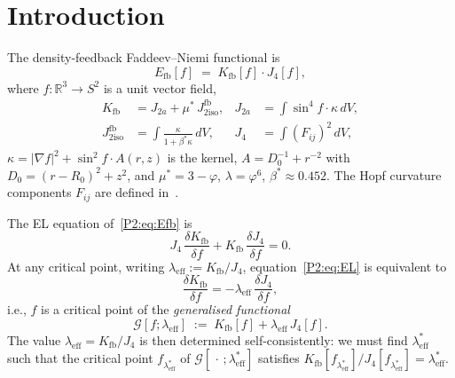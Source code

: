 \documentclass[11pt,a4paper]{article}
\newcommand{\vp}{\varphi}
\newcommand{\ms}{\mu^{*}}
\newcommand{\lam}{\lambda}
\newcommand{\leff}{\lambda_{\mathrm{eff}}}
\newcommand{\bst}{\beta^{*}}
\newcommand{\Kfb}{K_{\mathrm{fb}}}
\newcommand{\Efb}{E_{\mathrm{fb}}}
\newcommand{\Jfb}{J_{2\mathrm{iso}}^{\mathrm{fb}}}
\newcommand{\Ja}{J_{2a}}
\newcommand{\Jfour}{J_{4}}
\newcommand{\kk}{\kappa}
\newcommand{\G}{\mathcal{G}}
\theoremstyle{remark}
\begin{document}
\section{Introduction}
\label{P2:sec:intro}

The density-feedback Faddeev--Niemi functional is
\begin{equation}
  \Efb[f] \;=\; \Kfb[f]\cdot\Jfour[f],
  \label{P2:eq:Efb}
\end{equation}
where $f\colon\mathbb{R}^3\to S^2$ is a unit vector field,
\begin{align}
  \Kfb  &= \Ja + \ms\,\Jfb, &
  \Ja   &= \int \sin^4\!f\cdot\kk\,dV, \\
  \Jfb  &= \int \frac{\kk}{1+\bst\kk}\,dV, &
  \Jfour &= \int (F_{ij})^2\,dV,
\end{align}
$\kk = |\nabla f|^2 + \sin^2\!f\cdot A(r,z)$ is the kernel,
$A = D_0^{-1}+r^{-2}$ with $D_0=(r-R_0)^2+z^2$,
and $\ms = 3-\vp$, $\lam = \vp^6$, $\bst \approx 0.452$.
The Hopf curvature components $F_{ij}$ are defined in~\cite{Paper1}.

The EL equation of~\eqref{P2:eq:Efb} is
\begin{equation}
  \Jfour\,\frac{\delta\Kfb}{\delta f}
  + \Kfb\,\frac{\delta\Jfour}{\delta f} = 0.
  \label{P2:eq:EL}
\end{equation}
At any critical point, writing $\leff := \Kfb/\Jfour$,
equation~\eqref{P2:eq:EL} is equivalent to
\begin{equation}
  \frac{\delta\Kfb}{\delta f} = -\leff\,\frac{\delta\Jfour}{\delta f},
  \label{P2:eq:BPS}
\end{equation}
i.e., $f$ is a critical point of the \emph{generalised functional}
\begin{equation}
  \G[f;\leff] \;:=\; \Kfb[f] + \leff\,\Jfour[f].
  \label{P2:eq:G}
\end{equation}
The value $\leff = \Kfb/\Jfour$ is then determined self-consistently:
we must find $\leff^*$ such that the critical point $f_{\leff^*}$ of
$\G[\,\cdot\,;\leff^*]$ satisfies $\Kfb[f_{\leff^*}]/\Jfour[f_{\leff^*}]=\leff^*$.
\end{document}
